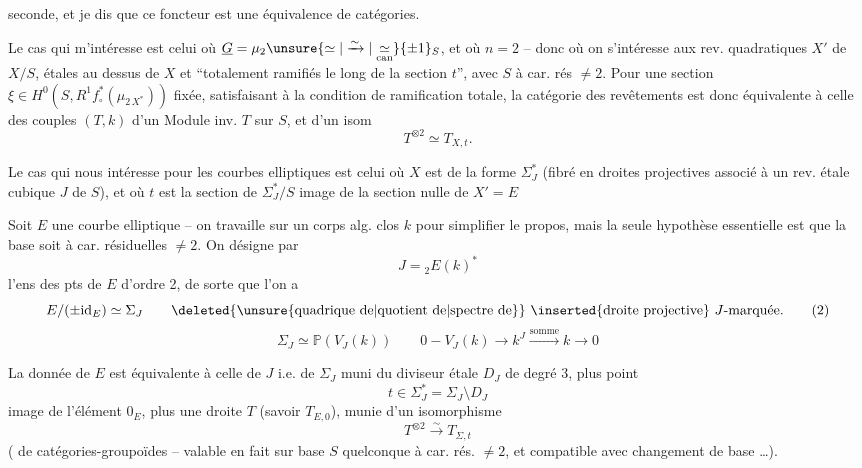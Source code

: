 seconde, et je dis que ce foncteur est une équivalence de catégories.

Le cas qui m'intéresse est celui où $\underline G=\mu_2\unsure{\simeq|\xrightarrow{\sim}|\underset{\mathrm{can}}{\simeq}}\{\pm1\}_S$, et où $n=2$ -- donc où on s'intéresse aux rev. quadratiques $X'$ de $X/S$, étales au dessus de $X$ et ``totalement ramifiés le long de la section $t$'', avec $S$ à car. rés $\ne 2$.  Pour une section $\xi\in H^0(S,R^1f_\circ^\ast(\mu_{2\,X^\ast}))$ fixée, satisfaisant à la condition de ramification totale, la catégorie des revêtements  est donc équivalente à celle des  couples $(T,k)$ d'un Module inv. $T$ sur $S$, et d'un isom
\[
T^{\otimes2}\simeq T_{X,t} .
\]

Le cas qui nous intéresse pour les courbes elliptiques est celui où $X$ est de la forme $\Sigma_{J}^\ast$ (fibré en droites projectives associé à un rev. étale cubique $J$ de $S$),  et où $t$ est la section de $\Sigma_J^\ast/S$  image de la section nulle de $X'=E$ 

Soit $E$ une courbe elliptique -- on travaille sur un corps alg. clos $k$ pour simplifier le propos, mais la seule hypothèse essentielle est que la base soit à car. résiduelles $\ne2$. On désigne par 
\[
J={}_2E(k)^\ast \tag*{(1)}
\]
l'ens des pts de $E$ d'ordre 2, de sorte que l'on a
\[
E/(\pm\mathrm{id}_E)\simeq\Sigma_J\qquad
\text{\deleted{\unsure{quadrique de|quotient de|spectre de}} \inserted{droite projective} $J$-marquée.} \tag*{(2)}
\]
\[
\Sigma_J\simeq\mathbb P(V_J(k))\qquad
0\mathbin{-} V_J(k)\to k^J\xrightarrow{\mathrm{somme}} k\to 0 \tag*{(3)}
\]

La donnée de $E$ est équivalente à celle de $J$ i.e. de $\Sigma_J$ muni du diviseur étale $D_J$ de degré 3, plus  point
\[
t\in\Sigma_J^\ast=\Sigma_J\setminus D_J \tag*{(4)}
\]
image de l'élément $0_E$, plus une droite $T$  (savoir $T_{E,0}$), munie d'un isomorphisme
\[
T^{\otimes2}\xrightarrow{\sim}T_{\Sigma,t} \tag*{(5)}
\]
(  de catégories-groupoïdes -- valable en fait sur base $S$ quelconque à car. rés. $\ne2$, et compatible avec changement de base \ldots).

